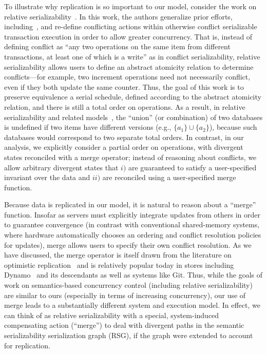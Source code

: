 To illustrate why replication is so important to our model, consider
the work on relative serializability~\cite{rel-serial}. In this work,
the authors generalize prior efforts,
including~\cite{korth-serializability,garciamolina-semantics,atomictransactions,tamer-tods},
and re-define conflicting actions within otherwise conflict
serializable transaction execution in order to allow greater
concurrency. That is, instead of defining conflict as ``any two
operations on the same item from different transactions, at least one
of which is a write'' as in conflict serializability, relative
serializability allows users to define an abstract atomicity relation
to determine conflicts---for example, two increment operations need
not necessarily conflict, even if they both update the same
counter. Thus, the goal of this work is to preserve equivalence a
serial schedule, defined according to the abstract atomicity relation,
and there is still a total order on operations. As a result, in
relative serializability and related models~\cite{pwsr-pods}, the
``union'' (or combination) of two databases is undefined if two items
have different versions (e.g., $\{a_1\} \cup \{a_2\}$), because such
databases would correspond to two separate total orders. In contrast,
in our \iconfluence analysis, we explicitly consider a partial order
on operations, with divergent states reconciled with a merge operator;
instead of reasoning about conflicts, we allow arbitrary divergent
states that $i)$ are guaranteed to satisfy a user-specified invariant
over the data and $ii)$ are reconciled using a user-specified merge
function.

Because data is replicated in our model, it is natural to reason about
a ``merge'' function. Insofar as servers must explicitly integrate
updates from others in order to guarantee convergence (in contrast
with conventional shared-memory systems, where hardware automatically
chooses an ordering and conflict resolution policies for updates),
merge allows users to specify their own conflict resolution. As we
have discussed, the merge operator is itself drawn from the literature
on optimistic replication~\cite{optimistic} and is relatively popular
today in stores including Dynamo~\cite{dynamo} and its descendants as
well as systems like Git. Thus, while the goals of work on
semantics-based concurrency control (including relative
serializability) are similar to ours (especially in terms of
increasing concurrency), our use of merge leads to a substantially
different system and execution model. In effect, we can think of
\iconfluence as relative serializability with a special,
system-induced compensating action (``merge'') to deal with divergent
paths in the semantic serializability serialization graph (RSG), if
the graph were extended to account for replication.

